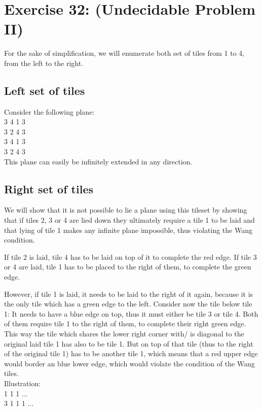 \documentclass[12pt]{article}
\begin{document}
\section*{Exercise 32: (Undecidable Problem II)}

For the sake of simplification, we will enumerate both set of tiles from 1 to 4, from the left to the right.

\subsection*{Left set of tiles}

Consider the following plane:\\
3 4 1 3\\
3 2 4 3\\
3 4 1 3\\
3 2 4 3\\
This plane can easily be infinitely extended in any direction.

\subsection*{Right set of tiles}

We will show that it is not possible to lie a plane using this tileset by showing that if tiles 2, 3 or 4 are lied down they ultimately require a tile 1 to be laid and that lying of tile 1 makes any infinite plane impossible, thus violating the Wang condition.

If tile 2 is laid, tile 4 has to be laid on top of it to complete the red edge. If tile 3 or 4 are laid, tile 1 has to be placed to the right of them, to complete the green edge. 

However, if tile 1 is laid, it needs to be laid to the right of it again, because it is the only tile which has a green edge to the left. Consider now the tile below tile 1: It needs to have a blue edge on top, thus it must either be tile 3 or tile 4. Both of them require tile 1 to the right of them, to complete their right green edge. This way the tile which shares the lower right corner with/ is diagonal to the original laid tile 1 has also to be tile 1. But on top of that tile (thus to the right of the original tile 1) has to be another tile 1, which means that a red upper edge would border an blue lower edge, which would violate the condition of the Wang tiles.\\
Illustration:\\
1 1 1 ...\\
3 1 1 1 ...\\


\end{document}
